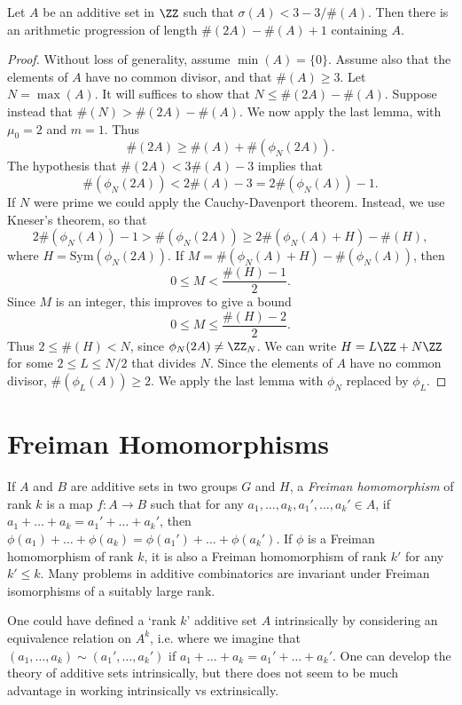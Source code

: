 \begin{theorem}
    Let $A$ be an additive set in $\ZZ$ such that $\sigma(A) < 3 - 3/\#(A)$. Then there is an arithmetic progression of length $\#(2A) - \#(A) + 1$ containing $A$.
\end{theorem}
\begin{proof}
    Without loss of generality, assume $\min(A) = \{ 0 \}$. Assume also that the elements of $A$ have no common divisor, and that $\#(A) \geq 3$. Let $N = \max(A)$. It will suffices to show that $N \leq \#(2A) - \#(A)$. Suppose instead that $\#(N) > \#(2A) - \#(A)$. We now apply the last lemma, with $\mu_0 = 2$ and $m = 1$. Thus
    \[ \#(2A) \geq \#(A) + \#(\phi_N(2A)). \]
    The hypothesis that $\#(2A) < 3\#(A) - 3$ implies that
    \[ \#(\phi_N(2A)) < 2\#(A) - 3 = 2\#(\phi_N(A)) - 1. \]
    If $N$ were prime we could apply the Cauchy-Davenport theorem. Instead, we use Kneser's theorem, so that
    \[ 2\#(\phi_N(A)) - 1 > \#(\phi_N(2A)) \geq 2\#(\phi_N(A) + H) - \#(H), \]
    where $H = \text{Sym}(\phi_N(2A))$. If $M = \#(\phi_N(A) + H) - \#(\phi_N(A))$, then
    \[ 0 \leq M < \frac{\#(H) - 1}{2}. \]
    Since $M$ is an integer, this improves to give a bound
    \[ 0 \leq M \leq \frac{\#(H) - 2}{2}. \]
    Thus $2 \leq \#(H) < N$, since $\phi_N(2A) \neq \ZZ_N$. We can write $H = L \ZZ + N \ZZ$ for some $2 \leq L \leq N/2$ that divides $N$. Since the elements of $A$ have no common divisor, $\#(\phi_L(A)) \geq 2$. We apply the last lemma with $\phi_N$ replaced by $\phi_L$.
\end{proof}

\section{Freiman Homomorphisms}

If $A$ and $B$ are additive sets in two groups $G$ and $H$, a \emph{Freiman homomorphism} of rank $k$ is a map $f: A \to B$ such that for any $a_1,\dots,a_k,a_1',\dots,a_k' \in A$, if $a_1 + \dots + a_k = a_1' + \dots + a_k'$, then $\phi(a_1) + \dots + \phi(a_k) = \phi(a_1') + \dots + \phi(a_k')$. If $\phi$ is a Freiman homomorphism of rank $k$, it is also a Freiman homomorphism of rank $k'$ for any $k' \leq k$. Many problems in additive combinatorics are invariant under Freiman isomorphisms of a suitably large rank.

\begin{remark}
    One could have defined a `rank $k$' additive set $A$ intrinsically by considering an equivalence relation on $A^k$, i.e. where we imagine that $(a_1,\dots,a_k) \sim (a_1',\dots,a_k')$ if $a_1 + \dots + a_k = a_1' + \dots + a_k'$. One can develop the theory of additive sets intrinsically, but there does not seem to be much advantage in working intrinsically vs extrinsically.
\end{remark}

